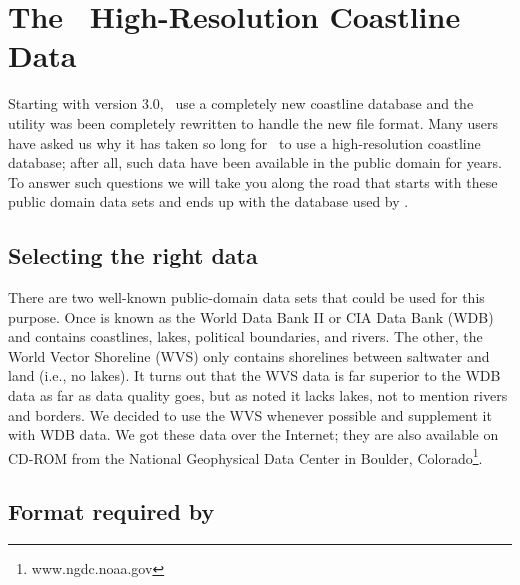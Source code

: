 %
%
\chapter{The \gmt\ High-Resolution Coastline Data}
\label{app:K}
\thispagestyle{headings}

Starting with version 3.0, \GMT\ use a completely new coastline
database and the  utility was been completely
rewritten to handle the new file format.  Many users have asked
us why it has taken so long for \GMT\ to use a high-resolution
coastline database; after all, such data have been available in
the public domain for years.  To answer such questions we will
take you along the road that starts with these public domain
data sets and ends up with the database used by \GMT.

\section{Selecting the right data} 

There are two well-known public-domain data sets that could be
used for this purpose.  Once is known as the World Data Bank II
or CIA Data Bank (WDB) and contains coastlines, lakes, political
boundaries, and rivers.  The other, the World Vector Shoreline
(WVS) only contains shorelines between saltwater and land (i.e.,
no lakes).  It turns out that the WVS data is far superior to the
WDB data as far as data quality goes, but as noted it lacks lakes,
not to mention rivers and borders.  We decided to use the WVS
whenever possible and supplement it with WDB data.  We got these
data over the Internet; they are also available on CD-ROM from
the National Geophysical Data Center in Boulder, Colorado\footnote{
www.ngdc.noaa.gov}.

\section{Format required by \gmt} 

